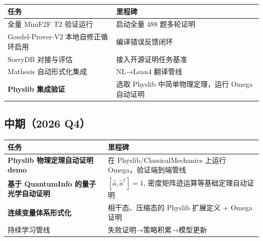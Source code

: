 \documentclass[
  11pt,
  a4paper,
]{ctexrep}
\newcounter{none} %
\begin{document}
{\def\LTcaptype{none} %
\begin{longtable}[]{@{}
  >{\raggedright\arraybackslash}p{}
  >{\raggedright\arraybackslash}p{}@{}}
\toprule\noalign{}
\begin{minipage}[b]{\linewidth}\raggedright
任务
\end{minipage} & \begin{minipage}[b]{\linewidth}\raggedright
里程碑
\end{minipage} \\
\midrule\noalign{}
\endhead
\bottomrule\noalign{}
\endlastfoot
全量 MiniF2F T2 验证运行 & 启动全量 488 题多轮证明 \\
Goedel-Prover-V2 本地自修正循环启用 & 编译错误反馈闭环 \\
SorryDB 对接与评估 & 接入开源证明任务基准 \\
Mathesis 自动形式化集成 & NL→Lean4 翻译管线 \\
\textbf{Physlib 集成验证} & 选取 Physlib 中简单物理定理，运行 Omega
自动证明 \\
\end{longtable}
}

\subsection{中期（2026 Q4）}\label{ux4e2dux671f2026-q4}

{\def\LTcaptype{none} %
\begin{longtable}[]{@{}
  >{\raggedright\arraybackslash}p{}
  >{\raggedright\arraybackslash}p{}@{}}
\toprule\noalign{}
\begin{minipage}[b]{\linewidth}\raggedright
任务
\end{minipage} & \begin{minipage}[b]{\linewidth}\raggedright
里程碑
\end{minipage} \\
\midrule\noalign{}
\endhead
\bottomrule\noalign{}
\endlastfoot
\textbf{Physlib 物理定理自动证明 demo} & 在 Physlib/ClassicalMechanics
上运行 Omega，验证端到端管线 \\
\textbf{基于 QuantumInfo 的量子光学自动证明} &
\([\hat{a}, \hat{a}^\dagger] = 1\), 密度矩阵迹运算等基础定理自动证明 \\
\textbf{连续变量体系形式化} & 相干态、压缩态的 Physlib 扩展定义 + Omega
证明 \\
持续学习管线 & 失败证明→策略积累→模型更新 \\
\end{longtable}
}
\end{document}
